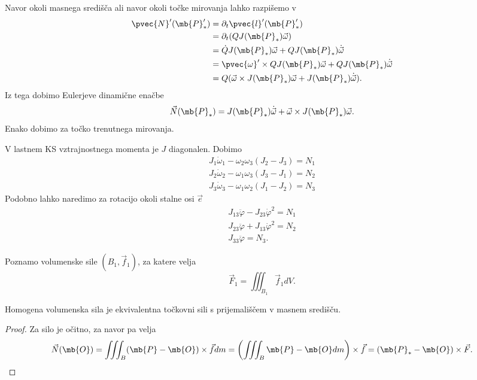 Navor okoli masnega središča ali navor okoli točke mirovanja lahko razpišemo v
\begin{align*}
  \pvec{N}'(\mb{P}_*')
  &= \partial_t \pvec{l}'(\mb{P}_*') \\
  &= \partial_t (Q J(\mb{P}_*) \vec{\omega}) \\
  &= \dot{Q} J(\mb{P}_*) \vec{\omega}
	+ Q J(\mb{P}_*) \dot{\vec{\omega}} \\
  &= \pvec{\omega}' \times Q J(\mb{P}_*) \vec{\omega}
	+ Q J(\mb{P}_*) \dot{\vec{\omega}} \\
  &= Q (\vec{\omega} \times J(\mb{P}_*) \vec{\omega}
	+ J(\mb{P}_*) \dot{\vec{\omega}}).
\end{align*}
Iz tega dobimo Eulerjeve dinamične enačbe
\[
  \vec{N}(\mb{P}_*) = J(\mb{P}_*) \dot{\vec{\omega}} + \vec{\omega} \times
  J(\mb{P}_*) \vec{\omega}.
\]
Enako dobimo za točko trenutnega mirovanja.


V lastnem KS vztrajnostnega momenta je $J$ diagonalen.
Dobimo
\begin{gather*}
  J_1 \dot{\omega}_1 - \omega_2 \omega_3 (J_2 - J_3) = N_1 \\
  J_2 \dot{\omega}_2 - \omega_1 \omega_3 (J_3 - J_1) = N_2 \\
  J_3 \dot{\omega}_3 - \omega_1 \omega_2 (J_1 - J_2) = N_3
\end{gather*}
Podobno lahko naredimo za rotacijo okoli stalne osi $\vec{e}$
\begin{gather*}
  J_{13} \ddot{\varphi} - J_{23} \dot{\varphi}^2 = N_1 \\
  J_{23} \ddot{\varphi} + J_{13} \dot{\varphi}^2 = N_2 \\
  J_{33} \ddot{\varphi} = N_3.
\end{gather*}


Poznamo volumenske sile $(B_1, \vec{f}_1)$, za katere velja
\[
  \vec{F}_1 = \iiint_{B_1} \vec{f}_1 dV.
\]

\begin{trditev}
  Homogena volumenska sila je ekvivalentna točkovni sili s prijemališčem v
  masnem središču.
\end{trditev}

\begin{proof}
  Za silo je očitno, za navor pa velja
  \[
	\vec{N}(\mb{O})
	= \iiint_B (\mb{P} - \mb{O}) \times \vec{f} dm
	= \left( \iiint_B \mb{P} - \mb{O} dm \right) \times \vec{f}
	= (\mb{P}_* - \mb{O}) \times \vec{F}.
  \]
\end{proof}

